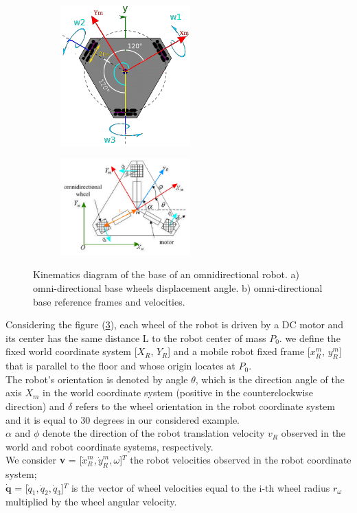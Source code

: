 \begin{figure}[H]
  \centering
  \begin{subfigure}[b]{0.5\textwidth}
     \centering
      \includegraphics[width=5cm]{images/03-foundation/triskarbase1}
	\caption{}
	\label{triskar1} 
  \end{subfigure}
  \begin{subfigure}[b]{0.5\textwidth}
  \centering
      \includegraphics[width=5cm]{images/03-foundation/triskarbase2}
	\caption{}
	\label{triskar2} 
  \end{subfigure}
  \caption{Kinematics diagram of the base of an omnidirectional robot. a) omni-directional base wheels displacement angle. b) omni-directional base reference frames and velocities.}
\end{figure}

Considering the figure (\ref{triskar2}), each wheel of the robot is driven by a DC motor and its center has the same distance L to the robot center of mass $P_0$. we define the fixed world coordinate system [$X_R$, $Y_R$] and a mobile robot fixed frame [${x}^m_R$, ${y}^m_R$] that is parallel to the floor and whose origin locates at $P_0$.\\
The robot's orientation is denoted by angle $\theta$, which is the direction angle of the axis $X_m$ in the world coordinate system (positive in the
counterclockwise direction) and $\delta$ refers to the wheel orientation in the robot coordinate system and it is equal to 30 degrees in our considered example.
\\
$\alpha$ and $\phi$ denote the direction of the robot translation velocity $v_R$ observed in the world and robot coordinate systems, respectively.\\
We consider \textbf{v} = [$\dot{x}^m_R,\dot{y}^m_R,\omega$]$^T$ the robot velocities observed in the robot coordinate system; \\
$\mathbf{\dot{q}}$ = [$\dot{q}_1,\dot{q}_2,\dot{q}_3$]$^T$ is the vector of wheel velocities equal to the i-th wheel radius $r_\omega$ multiplied by the wheel angular velocity.

